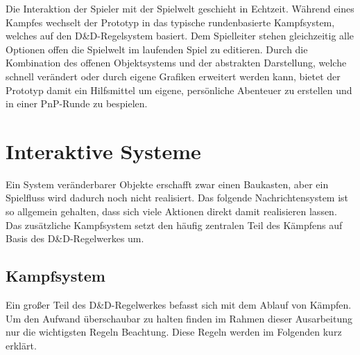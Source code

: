 Die Interaktion der Spieler mit der Spielwelt geschieht in Echtzeit. Während eines Kampfes wechselt der Prototyp in das typische rundenbasierte Kampfsystem, welches auf den D\&D-Regelsystem basiert. Dem Spielleiter stehen gleichzeitig alle Optionen offen die Spielwelt im laufenden Spiel zu editieren.\newline
Durch die Kombination des offenen Objektsystems und der abstrakten Darstellung, welche schnell verändert oder durch eigene Grafiken erweitert werden kann, bietet der Prototyp damit ein Hilfsmittel um eigene, persönliche Abenteuer zu erstellen und in einer PnP-Runde zu bespielen.


\section{Interaktive Systeme}
\label{sec:InteraktiveSysteme}
Ein System veränderbarer Objekte erschafft zwar einen Baukasten, aber ein Spielfluss wird dadurch noch nicht realisiert. Das folgende Nachrichtensystem ist so allgemein gehalten, dass sich viele Aktionen direkt damit realisieren lassen. Das zusätzliche Kampfsystem setzt den häufig zentralen Teil des Kämpfens auf Basis des D\&D-Regelwerkes um.

\subsection{Kampfsystem}
\label{sec:Kampfsystem}
Ein großer Teil des D\&D-Regelwerkes befasst sich mit dem Ablauf von Kämpfen. Um den Aufwand überschaubar zu halten finden im Rahmen dieser Ausarbeitung nur die wichtigsten Regeln Beachtung. Diese Regeln werden im Folgenden kurz erklärt. 

